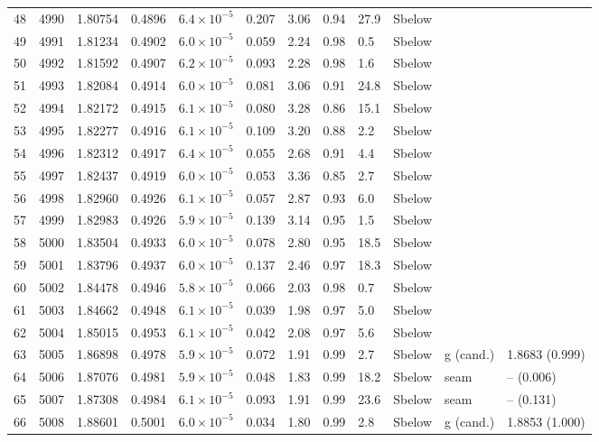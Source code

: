 \begin{longtable}{@{}rrllllllllll@{}}
 48 & 4990 & 1.80754 & 0.4896 & $6.4\times10^{-5}$ & 0.207 & 3.06 & 0.94 & 27.9 & Sbelow &  &  \\
 49 & 4991 & 1.81234 & 0.4902 & $6.0\times10^{-5}$ & 0.059 & 2.24 & 0.98 & 0.5 & Sbelow &  &  \\
 50 & 4992 & 1.81592 & 0.4907 & $6.2\times10^{-5}$ & 0.093 & 2.28 & 0.98 & 1.6 & Sbelow &  &  \\
 51 & 4993 & 1.82084 & 0.4914 & $6.0\times10^{-5}$ & 0.081 & 3.06 & 0.91 & 24.8 & Sbelow &  &  \\
 52 & 4994 & 1.82172 & 0.4915 & $6.1\times10^{-5}$ & 0.080 & 3.28 & 0.86 & 15.1 & Sbelow &  &  \\
 53 & 4995 & 1.82277 & 0.4916 & $6.1\times10^{-5}$ & 0.109 & 3.20 & 0.88 & 2.2 & Sbelow &  &  \\
 54 & 4996 & 1.82312 & 0.4917 & $6.4\times10^{-5}$ & 0.055 & 2.68 & 0.91 & 4.4 & Sbelow &  &  \\
 55 & 4997 & 1.82437 & 0.4919 & $6.0\times10^{-5}$ & 0.053 & 3.36 & 0.85 & 2.7 & Sbelow &  &  \\
 56 & 4998 & 1.82960 & 0.4926 & $6.1\times10^{-5}$ & 0.057 & 2.87 & 0.93 & 6.0 & Sbelow &  &  \\
 57 & 4999 & 1.82983 & 0.4926 & $5.9\times10^{-5}$ & 0.139 & 3.14 & 0.95 & 1.5 & Sbelow &  &  \\
 58 & 5000 & 1.83504 & 0.4933 & $6.0\times10^{-5}$ & 0.078 & 2.80 & 0.95 & 18.5 & Sbelow &  &  \\
 59 & 5001 & 1.83796 & 0.4937 & $6.0\times10^{-5}$ & 0.137 & 2.46 & 0.97 & 18.3 & Sbelow &  &  \\
 60 & 5002 & 1.84478 & 0.4946 & $5.8\times10^{-5}$ & 0.066 & 2.03 & 0.98 & 0.7 & Sbelow &  &  \\
 61 & 5003 & 1.84662 & 0.4948 & $6.1\times10^{-5}$ & 0.039 & 1.98 & 0.97 & 5.0 & Sbelow &  &  \\
 62 & 5004 & 1.85015 & 0.4953 & $6.1\times10^{-5}$ & 0.042 & 2.08 & 0.97 & 5.6 & Sbelow &  &  \\
 63 & 5005 & 1.86898 & 0.4978 & $5.9\times10^{-5}$ & 0.072 & 1.91 & 0.99 & 2.7 & Sbelow & g (cand.) & 1.8683 (0.999) \\
 64 & 5006 & 1.87076 & 0.4981 & $5.9\times10^{-5}$ & 0.048 & 1.83 & 0.99 & 18.2 & Sbelow & seam & -- (0.006) \\
 65 & 5007 & 1.87308 & 0.4984 & $6.1\times10^{-5}$ & 0.093 & 1.91 & 0.99 & 23.6 & Sbelow & seam & -- (0.131) \\
 66 & 5008 & 1.88601 & 0.5001 & $6.0\times10^{-5}$ & 0.034 & 1.80 & 0.99 & 2.8 & Sbelow & g (cand.) & 1.8853 (1.000) \\

\end{longtable}
